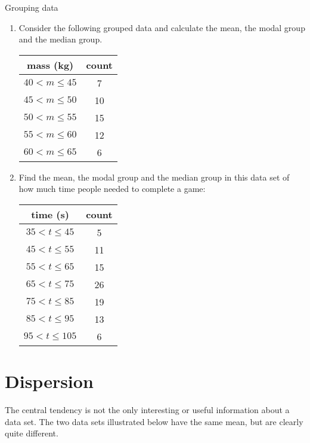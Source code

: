 \begin{exercises}{Grouping data}
  \begin{enumerate}

  \item Consider the following grouped data and calculate the mean,
    the modal group and the median group.

    \begin{center}
      \begin{tabular}{cc}
        \toprule
        mass (kg) & count \\
        \midrule
        $40 < m \le 45$ & 7 \\
        $45 < m \le 50$ & 10 \\
        $50 < m \le 55$ & 15 \\
        $55 < m \le 60$ & 12 \\
        $60 < m \le 65$ & 6 \\
        \bottomrule
      \end{tabular}
    \end{center}

  \item Find the mean, the modal group and the median group in this
    data set of how much time people needed to complete a game:
    \begin{center}
      \begin{tabular}{cc}
        \toprule
        time (s) & count \\
        \midrule
        $35 < t \le 45$ & 5 \\
        $45 < t \le 55$ & 11 \\
        $55 < t \le 65$ & 15 \\
        $65 < t \le 75$ & 26 \\
        $75 < t \le 85$ & 19 \\
        $85 < t \le 95$ & 13 \\
        $95 < t \le 105$ & 6 \\
        \bottomrule
      \end{tabular}
    \end{center}

  \end{enumerate}
\end{exercises}

\section{Dispersion}
The central tendency is not the only interesting or useful information
about a data set. The two data sets illustrated below have the same mean,
but are clearly quite different.

